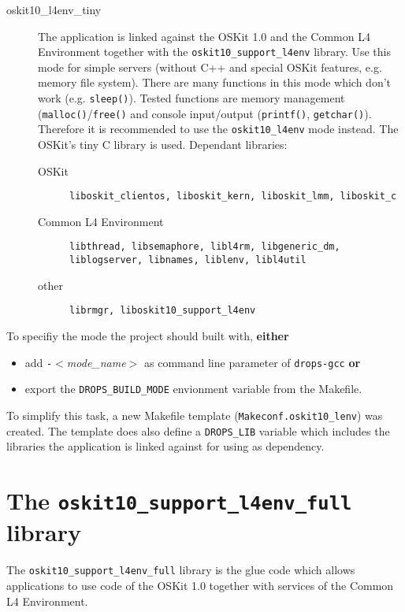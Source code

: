 \documentclass[twocolumn,10pt]{article}
\begin{document}
\begin{description}
\item[oskit10\_l4env\_tiny]
  The application is linked against the OSKit 1.0 and the Common L4
  Environment together with the \texttt{oskit10\_support\_l4env} library.
  Use this mode for simple servers (without C++ and special OSKit features,
  e.g. memory file system).
  There are many functions in this mode which don't work (e.g. 
  \texttt{sleep()}). Tested functions are memory management
  (\texttt{malloc()}/\texttt{free()} and console input/output
  (\texttt{printf()}, \texttt{getchar()}). Therefore it is recommended
  to use the \texttt{oskit10\_l4env} mode instead. The OSKit's tiny C
  library is used.
  Dependant libraries:
  \begin{description}
  \item[OSKit]
  \texttt{liboskit\_clientos, liboskit\_kern, liboskit\_lmm, liboskit\_c}
  \item[Common L4 Environment]
  \texttt{libthread, libsemaphore, libl4rm, libgeneric\_dm, liblogserver,
  libnames, liblenv, libl4util}
  \item[other]
  \texttt{librmgr, liboskit10\_support\_l4env}
  \end{description}

\end{description}

To specifiy the mode the project should built with, \textbf{either}

\begin{itemize}
\item add \texttt{-}\textsl{$<$mode\_name$>$} as command line parameter
  of \texttt{drops-gcc} \textbf{or}
\item export the \texttt{DROPS\_BUILD\_MODE} envionment variable
  from the Makefile.
\end{itemize}

To simplify this task, a new Makefile template
(\texttt{Makeconf.oskit10\_lenv}) was created.
The template does also define a \texttt{DROPS\_LIB}
variable which includes the libraries the application is linked
against for using as dependency.


\section{The \texttt{oskit10\_support\_l4env\_full} library}
The \texttt{oskit10\_support\_l4env\_full} library is the glue code
which allows applications to use code of the OSKit 1.0 together with
services of the Common L4 Environment.
\end{document}

